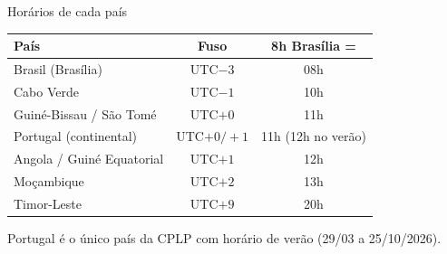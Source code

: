 \documentclass[aspectratio=169]{beamer}
\begin{document}
\begin{frame}{Horários de cada país}
\small
\centering
\renewcommand{\arraystretch}{1.25}
\begin{tabular}{lcc}
\toprule
\textbf{País} & \textbf{Fuso} & \textbf{8h Brasília =} \\
\midrule
Brasil (Brasília)          & UTC$-3$      & 08h \\
Cabo Verde                 & UTC$-1$      & 10h \\
Guiné-Bissau / São Tomé     & UTC$+0$      & 11h \\
Portugal (continental)     & UTC$+0/+1$   & 11h (12h no verão) \\
Angola / Guiné Equatorial  & UTC$+1$      & 12h \\
Moçambique                 & UTC$+2$      & 13h \\
Timor-Leste                & UTC$+9$      & 20h \\
\bottomrule
\end{tabular}

\vspace{0.6em}
\footnotesize Portugal é o único país da CPLP com horário de verão (29/03 a 25/10/2026).
\end{frame}
\end{document}
